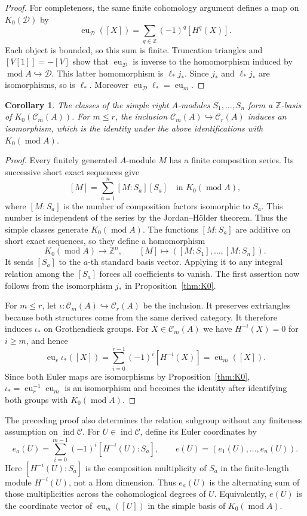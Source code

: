 \documentclass[pdflatex,sn-mathphys-num]{sn-jnl}
\numberwithin{equation}{section}
\newtheorem{corollary}[theorem]{Corollary}
\theoremstyle{definition}
\theoremstyle{remark}\newtheorem{remark}[theorem]{Remark}
\newcommand{\C}{\mathcal C}
\newcommand{\D}{\mathcal D}
\newcommand{\ind}{\operatorname{ind}}
\newcommand{\modu}{\operatorname{mod}}
\newcommand{\eu}{\operatorname{eu}}
\begin{document}
\begin{proof}
For completeness, the same finite cohomology argument defines a map on
$K_0(\D)$ by
\[
 \eu_{\D}([X])=\sum_{q\in\mathbb Z}(-1)^q[H^q(X)].
\]
Each object is bounded, so this sum is finite. Truncation triangles and
$[V[1]]=-[V]$ show that $\eu_{\D}$ is inverse to the homomorphism induced
by $\modu A\hookrightarrow\D$. This latter homomorphism is
$\ell_*j_*$. Since $j_*$ and $\ell_*j_*$ are isomorphisms, so is
$\ell_*$. Moreover $\eu_{\D}\ell_*=\eu_m$.
\end{proof}

\begin{corollary}\label{cor:simples}
The classes of the simple right $A$-modules $S_1,\ldots,S_n$
form a $\mathbb Z$-basis of $K_0(\C_m(A))$.
For $m\leq r$, the inclusion $\C_m(A)\hookrightarrow\C_r(A)$ induces
an isomorphism, which is the identity under the above identifications
with $K_0(\modu A)$.
\end{corollary}
\begin{proof}
Every finitely generated $A$-module $M$ has a finite composition
series. Its successive short exact sequences give
\[
 [M]=\sum_{a=1}^n[M:S_a][S_a]\quad\text{in }K_0(\modu A),
\]
where $[M:S_a]$ is the number of composition factors isomorphic to
$S_a$. This number is independent of the series by the
Jordan--H\"older theorem. Thus the simple classes generate $K_0(\modu A)$.
The functions $[M:S_a]$ are additive on short exact sequences, so
they define a homomorphism
\[
 K_0(\modu A)\longrightarrow\mathbb Z^n,\qquad
 [M]\longmapsto([M:S_1],\ldots,[M:S_n]).
\]
It sends $[S_a]$ to the $a$-th standard basis vector. Applying it to
any integral relation among the $[S_a]$ forces all coefficients to
vanish. The first assertion now follows from the isomorphism $j_*$
in Proposition~\ref{thm:K0}.

For $m\leq r$, let $\iota:\C_m(A)\hookrightarrow\C_r(A)$ be the
inclusion. It preserves extriangles because both structures come
from the same derived category. It therefore induces $\iota_*$ on
Grothendieck groups. For $X\in\C_m(A)$ we have $H^{-i}(X)=0$ for
$i\geq m$, and hence
\[
 \eu_r\iota_*([X])=\sum_{i=0}^{r-1}(-1)^i[H^{-i}(X)]
                 =\eu_m([X]).
\]
Since both Euler maps are isomorphisms by Proposition~\ref{thm:K0},
$\iota_*=\eu_r^{-1}\eu_m$ is an isomorphism and becomes the identity
after identifying both groups with $K_0(\modu A)$.
\end{proof}

The preceding proof also determines the relation subgroup without any
finiteness assumption on $\ind\C$. For $U\in\ind\C$, define
its Euler coordinates by
\[
 e_a(U)=\sum_{i=0}^{m-1}(-1)^i[H^{-i}(U):S_a],\qquad
 e(U)=(e_1(U),\ldots,e_n(U)).
\]
Here $[H^{-i}(U):S_a]$ is the composition multiplicity of $S_a$ in
the finite-length module $H^{-i}(U)$, not a Hom dimension. Thus
$e_a(U)$ is the alternating sum of those multiplicities across the
cohomological degrees of $U$. Equivalently, $e(U)$ is the coordinate
vector of $\eu_m([U])$ in the simple basis of $K_0(\modu A)$.
\end{document}
